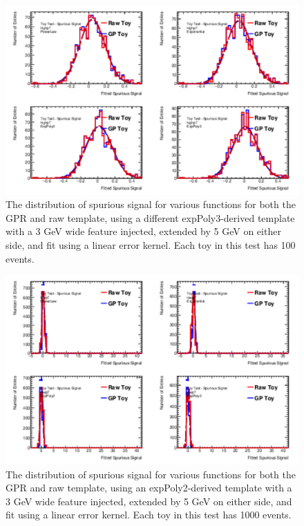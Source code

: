 \begin{figure} 
\begin{center}
  \includegraphics[width=\textwidth]{figures/background/gpr/validation/linear/ToyTest_FitSigVals_highpT_100_Sig}   
\caption{The distribution of spurious signal for various functions for both the GPR and raw template, using a different expPoly3-derived template with a 3 GeV wide feature injected, extended by 5 GeV on either side, and fit using a linear error kernel. Each toy in this test has 100 events.}
\label{fig:linearkernel_highpt_100_Sig}
\end{center}
\end{figure}

\begin{figure} 
\begin{center}
  \includegraphics[width=\textwidth]{figures/background/gpr/validation/linear/ToyTest_FitSigVals_lowpT_1000_Sig}   
\caption{The distribution of spurious signal for various functions for both the GPR and raw template, using an expPoly2-derived template with a 3 GeV wide feature injected, extended by 5 GeV on either side, and fit using a linear error kernel. Each toy in this test has 1000 events.}
\label{fig:linearkernel_lowpt_1000_Sig}
\end{center}
\end{figure}

